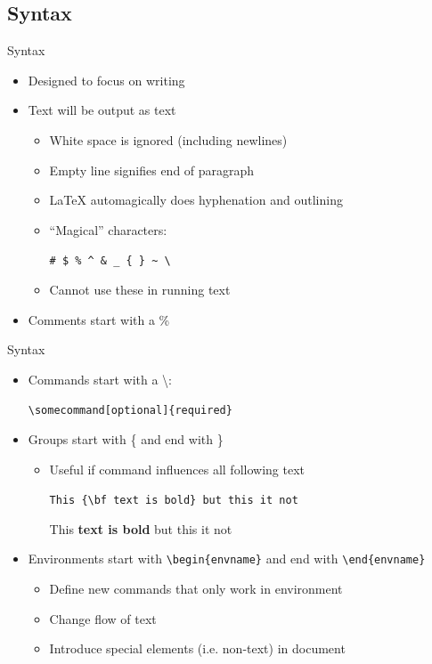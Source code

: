 \documentclass{beamer}
\begin{document}
\subsection{Syntax}
\begin{frame}[fragile]{Syntax}
    \begin{itemize}
        \item Designed to focus on writing
        \item Text will be output as text
            \begin{itemize}
                \item White space is ignored (including newlines)
                \item Empty line signifies end of paragraph
                \item \LaTeX{} automagically does hyphenation and outlining
                \item ``Magical'' characters:

                    \lstinline+# $ % ^ & _ { } ~ \+  %
                \item Cannot use these in running text
            \end{itemize}
        \item Comments start with a \%
    \end{itemize}
\end{frame}

\begin{frame}[fragile]{Syntax}
    \begin{itemize}
        \item Commands start with a \textbackslash:

            \lstinline+\somecommand[optional]{required}+
        \item Groups start with \{ and end with \}
            \begin{itemize}
                \item Useful if command influences all following text

                    \lstinline+This {\bf text is bold} but this it not+

                    This {\bf text is bold} but this it not
            \end{itemize}
        \item Environments start with \lstinline+\begin{envname}+ and end with
                \lstinline+\end{envname}+
            \begin{itemize}
                \item Define new commands that only work in environment
                \item Change flow of text
                \item Introduce special elements (i.e. non-text) in
                    document
            \end{itemize}
    \end{itemize}
\end{frame}
\end{document}
